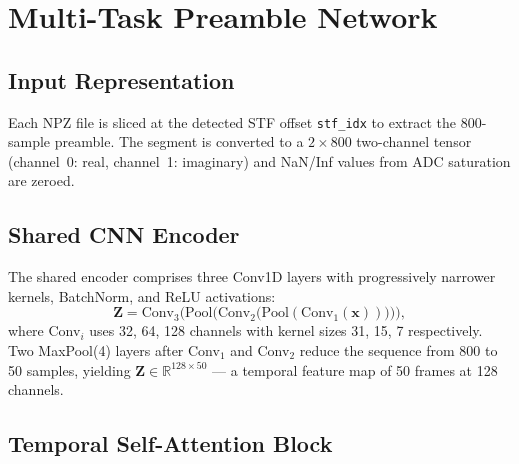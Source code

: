 \documentclass[conference]{IEEEtran}
\begin{document}
\section{Multi-Task Preamble Network}
\label{sec:model}

\subsection{Input Representation}
\label{sec:input}

Each NPZ file is sliced at the detected STF offset \texttt{stf\_idx}
to extract the 800-sample preamble.
The segment is converted to a $2 \times 800$ two-channel tensor
(channel~0: real, channel~1: imaginary) and NaN/Inf values from ADC
saturation are zeroed.

\subsection{Shared CNN Encoder}
\label{sec:encoder}

The shared encoder comprises three Conv1D layers with progressively
narrower kernels, BatchNorm, and ReLU activations:
\begin{equation}
  \mathbf{Z} = \text{Conv}_3\bigl(\text{Pool}\bigl(
    \text{Conv}_2\bigl(\text{Pool}(\text{Conv}_1(\mathbf{x}))\bigr)
  \bigr)\bigr),
\end{equation}
where Conv$_i$ uses 32, 64, 128 channels with kernel sizes 31, 15, 7
respectively.
Two MaxPool(4) layers after Conv$_1$ and Conv$_2$ reduce the sequence
from 800 to 50 samples, yielding $\mathbf{Z} \in \mathbb{R}^{128 \times 50}$
— a temporal feature map of 50 frames at 128 channels.

\subsection{Temporal Self-Attention Block}
\label{sec:attn}
\end{document}
